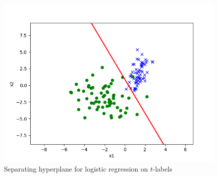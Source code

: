 \begin{answer}

	\begin{figure}[H]
		\centering
		\vspace{-2mm}
		\includegraphics[width=0.65\linewidth]{../src/posonly/posonly_true_pred.png}
	\caption{Separating hyperplane for logistic regression on $t$-labels}
	\end{figure}

\end{answer}
